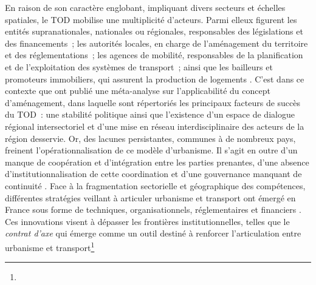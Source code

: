 \begin{refsegment}
En raison de son caractère englobant, impliquant divers secteurs et échelles spatiales, le \acrshort{TOD} mobilise une multiplicité d’acteurs. Parmi elleux figurent les entités supranationales, nationales ou régionales, responsables des législations et des financements~; les autorités locales, en charge de l’aménagement du territoire et des réglementations~; les agences de mobilité, responsables de la planification et de l’exploitation des systèmes de transport~; ainsi que les bailleurs et promoteurs immobiliers, qui assurent la production de logements \textcolor{blue}{\autocite[8]{mathur_promoting_2020}}. C'est dans ce contexte que \textcolor{blue}{\textcite[152]{thomas_defining_2017}} ont publié une méta-analyse sur l'applicabilité du concept d'aménagement, dans laquelle sont répertoriés les principaux facteurs de succès du \acrshort{TOD}~: une stabilité politique ainsi que l’existence d’un espace de dialogue régional intersectoriel et d'une mise en réseau interdisciplinaire des acteurs de la région desservie. Or, des lacunes persistantes, communes à de nombreux pays, freinent l’opérationnalisation de ce modèle d’urbanisme. Il s'agit en outre d'un manque de coopération et d’intégration entre les parties prenantes, d'une absence d’institutionnalisation de cette coordination et d'une gouvernance manquant de continuité \textcolor{blue}{\autocite[124]{ibraeva_transit-oriented_2020}}. Face à la fragmentation sectorielle et géographique des compétences, différentes stratégies veillant à articuler urbanisme et transport ont émergé en France \textcolor{blue}{\autocites[10]{gallez_rooutils_2015}[2]{cerema_outils_2021}} sous forme de  techniques, organisationnels, réglementaires et financiers \textcolor{blue}{\autocite[]{faure_regions_2006}}. Ces innovations visent à dépasser les frontières institutionnelles, telles que le \textsl{contrat d’axe} qui émerge comme un outil destiné à renforcer l’articulation entre urbanisme et transport\footnote{
}
\end{refsegment}
